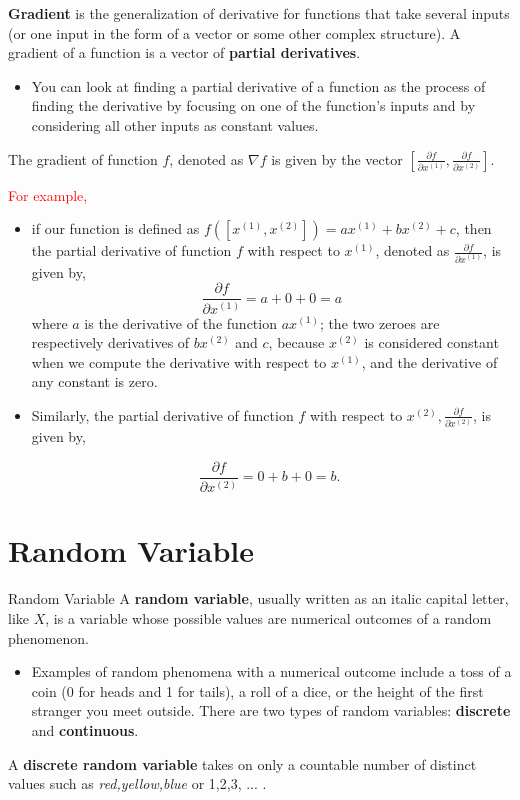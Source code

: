 \documentclass[9pt,dvipsnames]{beamer}
\begin{document}
\begin{frame}
	\textbf{Gradient} is the generalization of derivative for functions that take several inputs (or one input in the form of a vector or some other complex structure). A gradient of a function is a vector of \textbf{partial derivatives}.
	\begin{itemize}
		\item You can look at finding a partial derivative of a function as the process of finding the derivative by focusing on one of the function's inputs and by considering all other inputs as constant values.
	\end{itemize}

	The gradient of function $f$, denoted as $\nabla f$ is given by the vector $\left[\frac{\partial f}{\partial x^{(1)}}, \frac{\partial f}{\partial x^{(2)}}\right]$.
\end{frame}

\begin{frame}
	\textcolor{red}{For example,}
	\begin{itemize}
		\item if our function is defined as $f\left(\left[x^{(1)}, x^{(2)}\right]\right)=a x^{(1)}+b x^{(2)}+c$, then the partial derivative of function $f$ with respect to $x^{(1)}$, denoted as $\frac{\partial f}{\partial x^{(1)}}$, is given by,
		      $$
			      \frac{\partial f}{\partial x^{(1)}}=a+0+0=a
		      $$
		      where $a$ is the derivative of the function $a x^{(1)}$; the two zeroes are respectively derivatives of $b x^{(2)}$ and $c$, because $x^{(2)}$ is considered constant when we compute the derivative with respect to $x^{(1)}$, and the derivative of any constant is zero.
		\item Similarly, the partial derivative of function $f$ with respect to $x^{(2)}, \frac{\partial f}{\partial x^{(2)}}$, is given by,

		      $$
			      \frac{\partial f}{\partial x^{(2)}}=0+b+0=b \text {. }
		      $$
	\end{itemize}
\end{frame}

\section{Random Variable}
\begin{frame}{Random Variable}
	A \textbf{random variable}, usually written as an italic capital letter, like $X$, is a variable whose possible values are numerical outcomes of a random phenomenon.
	\begin{itemize}
		\item Examples of random phenomena with a numerical outcome include a toss of a coin (0 for heads and 1 for tails), a roll of a dice, or the height of the first stranger you meet outside. There are two types of random variables: \textbf{discrete} and \textbf{continuous}.
	\end{itemize}
	A \textbf{discrete random variable} takes on only a countable number of distinct values such as \textit{red,yellow,blue} or 1,2,3, ... .
\end{frame}
\end{document}
